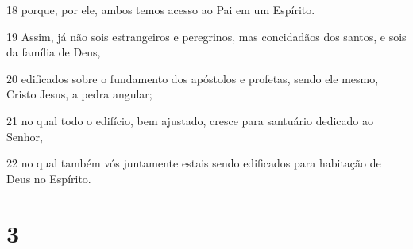 \par 18 porque, por ele, ambos temos acesso ao Pai em um Espírito.
\par 19 Assim, já não sois estrangeiros e peregrinos, mas concidadãos dos santos, e sois da família de Deus,
\par 20 edificados sobre o fundamento dos apóstolos e profetas, sendo ele mesmo, Cristo Jesus, a pedra angular;
\par 21 no qual todo o edifício, bem ajustado, cresce para santuário dedicado ao Senhor,
\par 22 no qual também vós juntamente estais sendo edificados para habitação de Deus no Espírito.

\chapter{3}

